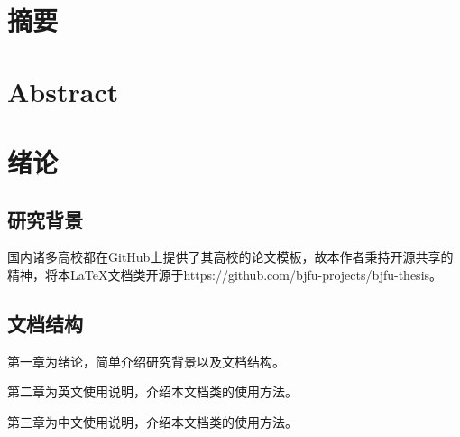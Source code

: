 \documentclass{bjfuthesis}
\begin{document}
	\frontmatter
	\chapter*{摘要}
\begin{abstract}
	bjfuthesis文档类是为北京林业大学学生书写毕业论文准备的\LaTeX 文档类。该文档类基于ctexbook文档类。它修改了一些布局与样式来提供与北京林业大学毕业论文规范兼容的文档布局。
\end{abstract}
\chapter*{Abstract}
\begin{abstract}
	The bjfuthesis class is a \LaTeX\space class intended for students in Beijing Forestry University to write their theses. The class is based on the ctexbook class. It modifies some of the layout and style definitions of these packages in order to provide a document layout that should be compatible with Beijing Forestry University Thesis Standard.
\end{abstract}
	\tableofcontents
	\mainmatter
	\chapter{绪论}
\section{研究背景}
国内诸多高校都在GitHub上提供了其高校的论文模板，故本作者秉持开源共享的精神，将本\LaTeX 文档类开源于https://github.com/bjfu-projects/bjfu-thesis。
\section{文档结构}
第一章为绪论，简单介绍研究背景以及文档结构。

第二章为英文使用说明，介绍本文档类的使用方法。

第三章为中文使用说明，介绍本文档类的使用方法。
\end{document}
